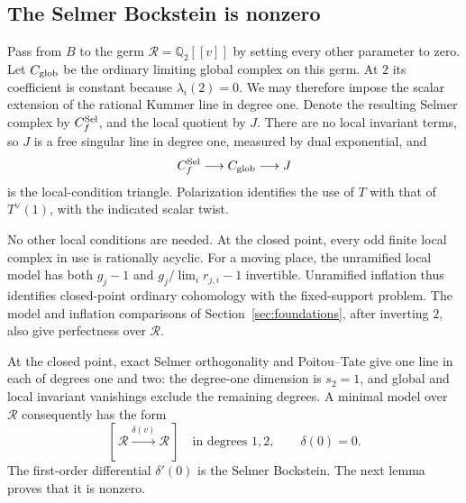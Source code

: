 \subsection{The Selmer Bockstein is nonzero}\label{subsec:positive-completion:bockstein}

Pass from \(B\) to the germ \(\mathcal R=\mathbb Q_2[[v]]\) by
setting every other parameter to zero. Let \(C_{\rm glob}\) be the
ordinary limiting global complex on this germ. At \(2\) its coefficient
is constant because \(\lambda_i(2)=0\). We may therefore impose the
scalar extension of the rational Kummer line in degree one. Denote
the resulting Selmer complex by \(C_f^{\rm Sel}\), and the local
quotient by \(J\). There are no local invariant terms, so \(J\) is a
free singular line in degree one, measured by dual exponential, and
\[
                 C_f^{\rm Sel}\longrightarrow C_{\rm glob}
                                      \longrightarrow J
\]
is the local-condition triangle. Polarization identifies the use of
\(T\) with that of \(T^\vee(1)\), with the indicated scalar twist.

No other local conditions are needed. At the closed point, every odd
finite local complex in use is rationally acyclic. For a moving place,
the unramified local model has both \(g_j-1\) and
\(g_j/\lim_i r_{j,i}-1\) invertible. Unramified inflation thus
identifies closed-point ordinary cohomology with the fixed-support
problem. The model and inflation comparisons of
Section~\ref{sec:foundations}, after inverting \(2\), also give
perfectness over \(\mathcal R\).

At the closed point, exact Selmer orthogonality and Poitou--Tate give
one line in each of degrees one and two: the degree-one dimension is
\(s_2=1\), and global and local invariant vanishings exclude the
remaining degrees. A minimal model over \(\mathcal R\) consequently
has the form
\[
       [\,\mathcal R\xrightarrow{\delta(v)}\mathcal R\,]
       \quad\text{in degrees }1,2,
       \qquad \delta(0)=0.
\]
The first-order differential \(\delta'(0)\) is the Selmer Bockstein.
The next lemma proves that it is nonzero.

